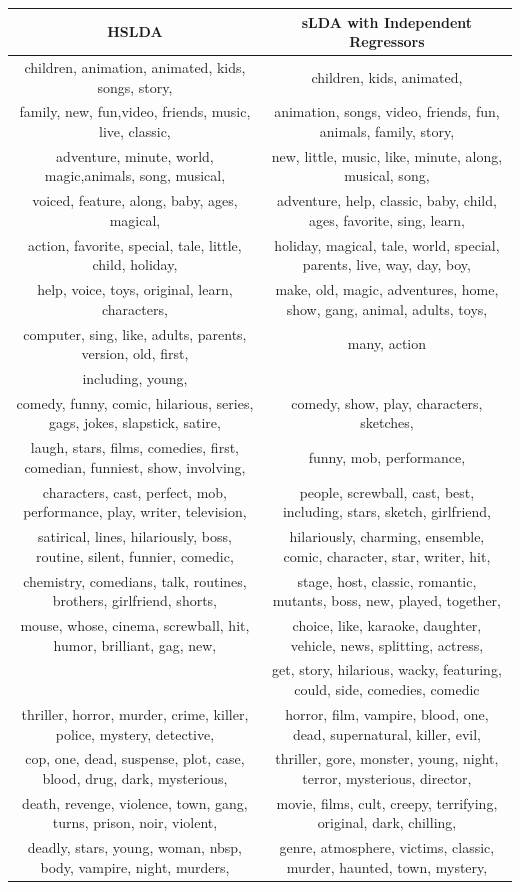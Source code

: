 \documentclass{article}
\begin{document}
\begin{tabular}{|c|c|}
\hline 
HSLDA & sLDA with Independent Regressors\tabularnewline
\hline 
children, animation, animated, kids, songs, story, & children, kids, animated, 
\tabularnewline
family, new, fun,video, friends, music, live, classic, & animation, songs, video, friends, fun, animals, family, story, 
\tabularnewline
adventure, minute, world, magic,animals, song, musical, & new, little, music, like, minute, along, musical, song,
\tabularnewline
voiced, feature, along, baby, ages, magical, & adventure, help, classic, baby, child, ages, favorite, sing, learn,
\tabularnewline
action, favorite, special, tale, little, child, holiday, & holiday, magical, tale, world, special, parents, live, way, day, boy,
\tabularnewline
help, voice, toys, original, learn, characters, & make, old, magic, adventures, home, show, gang, animal, adults, toys,
\tabularnewline
computer, sing, like, adults, parents, version, old, first, & many, action
\tabularnewline
including, young, 
\tabularnewline
\hline
comedy, funny, comic, hilarious, series, gags, jokes, slapstick, satire, & comedy, show, play, characters, sketches,
\tabularnewline
laugh, stars, films, comedies, first, comedian, funniest, show, involving, & funny, mob, performance,
\tabularnewline
characters, cast, perfect, mob, performance, play, writer, television, & people, screwball, cast, best, including, stars, sketch, girlfriend,
\tabularnewline
satirical, lines, hilariously, boss, routine, silent, funnier, comedic, & hilariously, charming, ensemble, comic, character, star, writer, hit,
\tabularnewline
chemistry, comedians, talk, routines, brothers, girlfriend, shorts, & stage, host, classic, romantic, mutants, boss, new, played, together,
\tabularnewline
mouse, whose, cinema, screwball, hit, humor, brilliant, gag, new,  & choice, like, karaoke, daughter, vehicle, news, splitting, actress,
\tabularnewline
& get, story, hilarious, wacky, featuring, could, side, comedies, comedic\tabularnewline
\hline 
thriller, horror, murder, crime, killer, police, mystery, detective, & horror, film, vampire, blood, one, dead, supernatural, killer, evil,
\tabularnewline
cop, one, dead, suspense, plot, case, blood, drug, dark, mysterious, & thriller, gore, monster, young, night, terror, mysterious, director,
\tabularnewline
death, revenge, violence, town, gang, turns, prison, noir, violent, & movie, films, cult, creepy, terrifying, original, dark, chilling,
\tabularnewline
deadly, stars, young, woman, nbsp, body, vampire, night, murders, & genre, atmosphere, victims, classic, murder, haunted, town, mystery,

\end{tabular}
\end{document}

